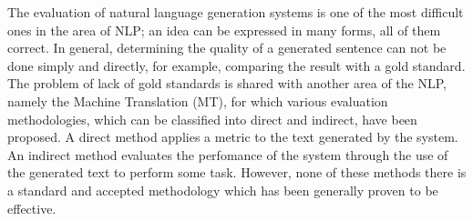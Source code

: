
The evaluation of natural language generation systems is one of the
most difficult ones in the area of NLP; an idea can be expressed in many
forms, all of them correct. In general, determining the quality of a
generated sentence can not be done simply and directly, for example, comparing
the result with a gold standard. The problem of lack of gold standards is shared
with another area of the NLP, namely the Machine Translation (MT), for which
various evaluation methodologies, which can be classified into direct and
indirect, have been proposed. A direct method applies a metric to the text
generated by the system. An indirect method evaluates the perfomance of the
system through the use of the generated text to perform some task. However, 
none of these methods there is a standard and accepted methodology which has
been generally proven to be effective.


